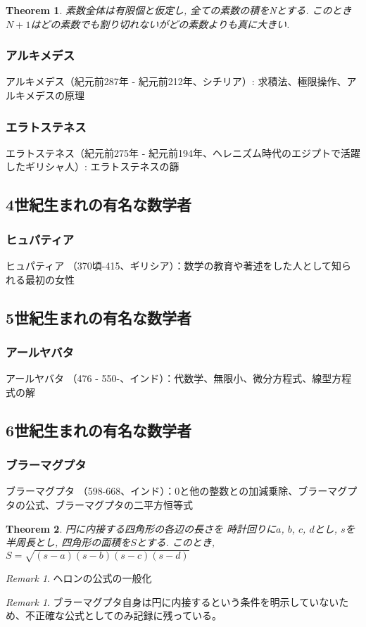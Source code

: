 \documentclass[a4paper,12pt]{jsarticle}
\theoremstyle{plain}
\newtheorem{theoremX}{Theorem}
\theoremstyle{remark}  %
\newtheorem{remark}[thm]{Remark}
\theoremstyle{definition}  %
\begin{document}
\begin{theoremX}
  素数全体は有限個と仮定し, 全ての素数の積をNとする.
  このとき$N+1$はどの素数でも割り切れないがどの素数よりも真に大きい.
\end{theoremX}



\subsubsection{アルキメデス}
アルキメデス（紀元前287年 - 紀元前212年、シチリア）: 求積法、極限操作、アルキメデスの原理

\subsubsection{エラトステネス}
    エラトステネス（紀元前275年 - 紀元前194年、ヘレニズム時代のエジプトで活躍したギリシャ人）: エラトステネスの篩

\subsection{4世紀生まれの有名な数学者}
\subsubsection{ヒュパティア}
ヒュパティア
\cite{wiki:ヒュパティア}
（370頃-415、ギリシア）：数学の教育や著述をした人として知られる最初の女性    

\subsection{5世紀生まれの有名な数学者}
\subsubsection{アールヤバタ}
アールヤバタ
\cite{wiki:アーリヤバタ}
（476 - 550-、インド）：代数学、無限小、微分方程式、線型方程式の解


\subsection{6世紀生まれの有名な数学者}
\subsubsection{ブラーマグプタ}
ブラーマグプタ
\cite{wiki:ブラフマグプタ}
（598-668、インド）：0と他の整数との加減乗除、ブラーマグプタの公式、ブラーマグプタの二平方恒等式
\begin{theoremX}
  円に内接する四角形の各辺の長さを
  時計回りに$a$, $b$, $c$, $d$とし, $s$を半周長とし,
  四角形の面積を$S$とする.
  このとき, $S=\sqrt{(s-a)(s-b)(s-c)(s-d)}$
\end{theoremX}
\begin{remark}
  ヘロンの公式の一般化
\end{remark}
\begin{remark}
  ブラーマグプタ自身は円に内接するという条件を明示していないため、不正確な公式としてのみ記録に残っている。
  \cite{wiki:ブラーマグプタの公式}
\end{remark}
\end{document}
